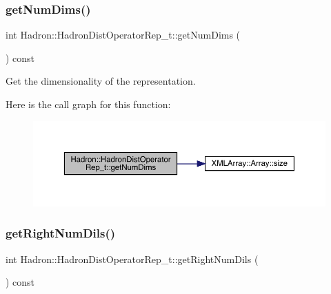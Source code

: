 \subsubsection{\texorpdfstring{getNumDims()}{getNumDims()}}
{\footnotesize\ttfamily int Hadron\+::\+Hadron\+Dist\+Operator\+Rep\+\_\+t\+::get\+Num\+Dims (\begin{DoxyParamCaption}{ }\end{DoxyParamCaption}) const}



Get the dimensionality of the representation. 

Here is the call graph for this function\+:\nopagebreak
\begin{figure}[H]
\begin{center}
\leavevmode
\includegraphics[width=350pt]{dd/de0/classHadron_1_1HadronDistOperatorRep__t_a19ee3c70f7ac127fbc534b0f69304b37_cgraph}
\end{center}
\end{figure}
\mbox{\label{classHadron_1_1HadronDistOperatorRep__t_ae7f1a0e6b68e409027be775990dd2970}} 
\subsubsection{\texorpdfstring{getRightNumDils()}{getRightNumDils()}}
{\footnotesize\ttfamily int Hadron\+::\+Hadron\+Dist\+Operator\+Rep\+\_\+t\+::get\+Right\+Num\+Dils (\begin{DoxyParamCaption}{ }\end{DoxyParamCaption}) const}

\mbox{\label{classHadron_1_1HadronDistOperatorRep__t_a05856fbd2f2205ddc461685d987713b9}} 
